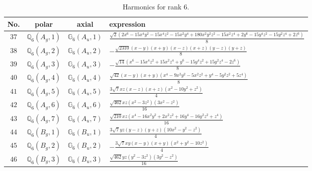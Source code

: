 \documentclass[fleqn,8pt,landscape]{jsarticle}
\begin{document}
\begin{table}[ht!]
\begin{center}
\caption{Harmonics for rank 6.}
\renewcommand{\arraystretch}{1.3}
\begin{tabular}{cccl} \hline \hline
No. & polar & axial & expression \\ \hline
$ 37 $ & $ \mathbb{Q}_{6}(A_{g},1) $ & $ \mathbb{G}_{6}(A_{u},1) $ & $ \frac{\sqrt{2} \left(2 x^{6} - 15 x^{4} y^{2} - 15 x^{4} z^{2} - 15 x^{2} y^{4} + 180 x^{2} y^{2} z^{2} - 15 x^{2} z^{4} + 2 y^{6} - 15 y^{4} z^{2} - 15 y^{2} z^{4} + 2 z^{6}\right)}{8} $ \\
$ 38 $ & $ \mathbb{Q}_{6}(A_{g},2) $ & $ \mathbb{G}_{6}(A_{u},2) $ & $ - \frac{\sqrt{2310} \left(x - y\right) \left(x + y\right) \left(x - z\right) \left(x + z\right) \left(y - z\right) \left(y + z\right)}{8} $ \\
$ 39 $ & $ \mathbb{Q}_{6}(A_{g},3) $ & $ \mathbb{G}_{6}(A_{u},3) $ & $ - \frac{\sqrt{14} \left(x^{6} - 15 x^{4} z^{2} + 15 x^{2} z^{4} + y^{6} - 15 y^{4} z^{2} + 15 y^{2} z^{4} - 2 z^{6}\right)}{8} $ \\
$ 40 $ & $ \mathbb{Q}_{6}(A_{g},4) $ & $ \mathbb{G}_{6}(A_{u},4) $ & $ \frac{\sqrt{42} \left(x - y\right) \left(x + y\right) \left(x^{4} - 9 x^{2} y^{2} - 5 x^{2} z^{2} + y^{4} - 5 y^{2} z^{2} + 5 z^{4}\right)}{8} $ \\
$ 41 $ & $ \mathbb{Q}_{6}(A_{g},5) $ & $ \mathbb{G}_{6}(A_{u},5) $ & $ \frac{3 \sqrt{7} x z \left(x - z\right) \left(x + z\right) \left(x^{2} - 10 y^{2} + z^{2}\right)}{4} $ \\
$ 42 $ & $ \mathbb{Q}_{6}(A_{g},6) $ & $ \mathbb{G}_{6}(A_{u},6) $ & $ \frac{\sqrt{462} x z \left(x^{2} - 3 z^{2}\right) \left(3 x^{2} - z^{2}\right)}{16} $ \\
$ 43 $ & $ \mathbb{Q}_{6}(A_{g},7) $ & $ \mathbb{G}_{6}(A_{u},7) $ & $ \frac{\sqrt{210} x z \left(x^{4} - 16 x^{2} y^{2} + 2 x^{2} z^{2} + 16 y^{4} - 16 y^{2} z^{2} + z^{4}\right)}{16} $ \\
$ 44 $ & $ \mathbb{Q}_{6}(B_{g},1) $ & $ \mathbb{G}_{6}(B_{u},1) $ & $ \frac{3 \sqrt{7} y z \left(y - z\right) \left(y + z\right) \left(10 x^{2} - y^{2} - z^{2}\right)}{4} $ \\
$ 45 $ & $ \mathbb{Q}_{6}(B_{g},2) $ & $ \mathbb{G}_{6}(B_{u},2) $ & $ - \frac{3 \sqrt{7} x y \left(x - y\right) \left(x + y\right) \left(x^{2} + y^{2} - 10 z^{2}\right)}{4} $ \\
$ 46 $ & $ \mathbb{Q}_{6}(B_{g},3) $ & $ \mathbb{G}_{6}(B_{u},3) $ & $ \frac{\sqrt{462} y z \left(y^{2} - 3 z^{2}\right) \left(3 y^{2} - z^{2}\right)}{16} $ \\

\end{tabular}
\end{center}
\end{table}
\end{document}
